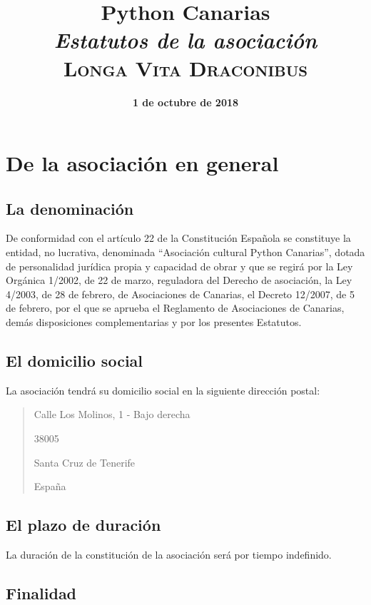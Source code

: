 \documentclass[a4paper, 12pt, oneside]{book}
\title{
    \huge \textbf{Python Canarias} \\
    \textit{Estatutos de la asociación} \\
    \vspace{1cm}
    \large \textsc{Longa Vita Draconibus}
}
\date{\textbf{1 de octubre de 2018}}
\author{}
\begin{document}
\maketitle

\tableofcontents

\chapter{De la asociación en general}

\section{La denominación}

De conformidad con el artículo 22 de la Constitución Española se constituye la entidad, no lucrativa, denominada ``Asociación cultural Python Canarias'', dotada de personalidad jurídica propia y capacidad de obrar y que se regirá por la Ley Orgánica 1/2002, de 22 de marzo, reguladora del Derecho de asociación, la Ley 4/2003, de 28 de febrero, de Asociaciones de Canarias, el Decreto 12/2007, de 5 de febrero, por el que se aprueba el Reglamento de Asociaciones de Canarias, demás disposiciones complementarias y por los presentes Estatutos.

\section{El domicilio social}

La asociación tendrá su domicilio social en la siguiente dirección postal:

\begin{quotation}
    Calle Los Molinos, 1 - Bajo derecha

    38005

    Santa Cruz de Tenerife

    España
\end{quotation}

\section{El plazo de duración}

La duración de la constitución de la asociación será por tiempo indefinido.

\section{Finalidad}
\end{document}
